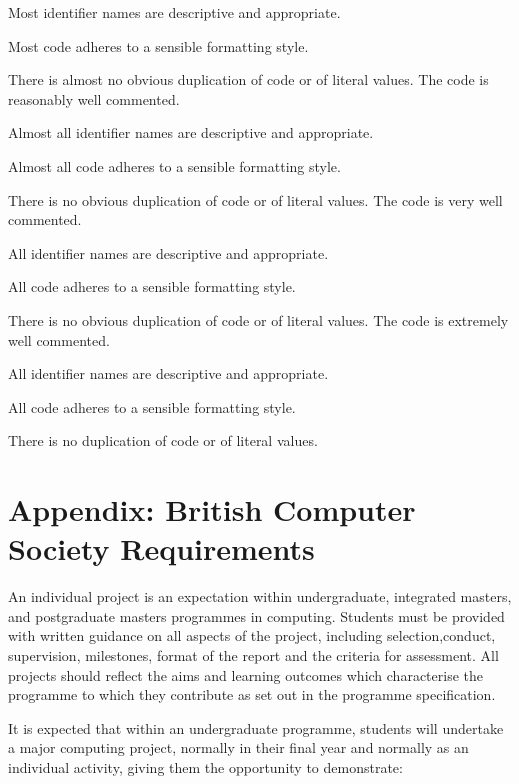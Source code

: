 \documentclass{../fal_assignment}
\begin{document}
\begin{markingrubric}
            \par Most identifier names are descriptive and appropriate.
            \par Most code adheres to a sensible formatting style.
             \par There is almost no obvious duplication of code or of literal values.   
        \grade The code is reasonably well commented.
            \par Almost all identifier names are descriptive and appropriate.
            \par Almost all code adheres to a sensible formatting style.
             \par There is no obvious duplication of code or of literal values.
        \grade The code is very well commented.
            \par All identifier names are descriptive and appropriate.
            \par All code adheres to a sensible formatting style.
             \par There is no obvious duplication of code or of literal values.
        \grade The code is extremely well commented.
            \par All identifier names are descriptive and appropriate.
            \par All code adheres to a sensible formatting style.
            \par There is no duplication of code or of literal values.
\end{markingrubric}

\section*{Appendix: British Computer Society Requirements}

An individual project is an expectation within undergraduate, integrated masters, and postgraduate masters programmes in computing. Students must be provided with written guidance on all aspects of the project, including selection,conduct, supervision, milestones, format of the report and the criteria for assessment. All projects should reflect the aims and learning outcomes which characterise the programme to which they contribute as set out in the programme specification.

It is expected that within an undergraduate programme, students will undertake a major computing project, normally in
their final year and normally as an individual activity, giving them the opportunity to demonstrate:
\end{document}
